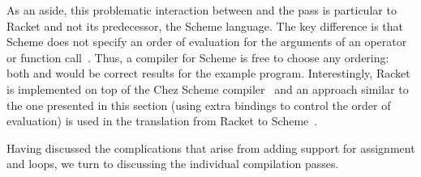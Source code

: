 \documentclass[7x10]{TimesAPriori_MIT}%
\numberwithin{theorem}{chapter}
\numberwithin{definition}{chapter}
\numberwithin{equation}{chapter}
\begin{document}
{As an aside, this problematic interaction between  and the
pass  is particular to Racket and not
its predecessor, the Scheme language. The key difference is that
Scheme does not specify an order of evaluation for the arguments of an
operator or function call~\citep{SPERBER:2009aa}. Thus, a compiler for
Scheme is free to choose any ordering: both  and 
would be correct results for the example program. Interestingly,
Racket is implemented on top of the Chez Scheme
compiler~\citep{Dybvig:2006aa} and an approach similar to the one
presented in this section (using extra  bindings to control
the order of evaluation) is used in the translation from Racket to
Scheme~\citep{Flatt:2019tb}.

\fi} %

Having discussed the complications that arise from adding support for
assignment and loops, we turn to discussing the individual compilation
passes.
\end{document}
